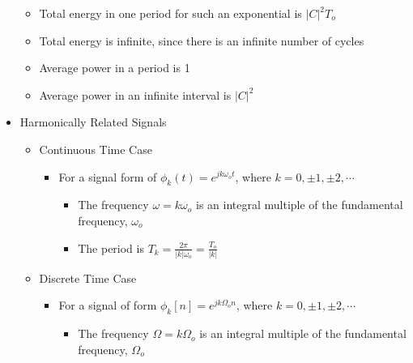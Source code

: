 \begin{itemize}
\begin{itemize}
\begin{itemize}
        \end{itemize}

      \item Total energy in one period for such an exponential is $|C|^2T_o$

      \item Total energy is infinite, since there is an infinite number of cycles

      \item Average power in a period is 1

      \item Average power in an infinite interval is $|C|^2$

    \end{itemize}

  \item Harmonically Related Signals

    \begin{itemize}

      \item Continuous Time Case

        \begin{itemize}

          \item For a signal form of $\phi_k(t)=e^{jk\omega_ot}$, where $k=0,\pm1,\pm2,\cdots$

            \begin{itemize}

              \item The frequency $\omega=k\omega_o$ is an integral multiple of the fundamental frequency, $\omega_o$

              \item The period is $T_k=\frac{2\pi}{|k|\omega_o}=\frac{T_o}{|k|}$

            \end{itemize}

        \end{itemize}

      \item Discrete Time Case

        \begin{itemize}

          \item For a signal of form $\phi_k[n]=e^{jk\Omega_on}$, where $k=0,\pm1,\pm2,\cdots$

            \begin{itemize}

              \item The frequency $\Omega=k\Omega_o$ is an integral multiple of the fundamental frequency, $\Omega_o$


\end{itemize}
\end{itemize}
\end{itemize}
\end{itemize}
